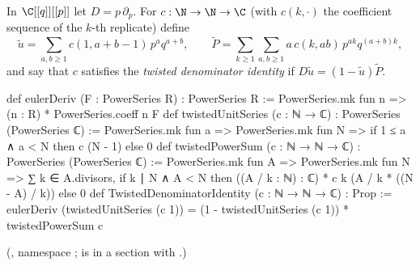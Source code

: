 \begin{definition}\label{ch19:def:twistedTD}
In $\C[[q]][[p]]$ let $D=p\,\partial_p$.  For $c:\N\to\N\to\C$ (with $c(k,\cdot)$ the coefficient sequence of the $k$-th
replicate) define
\begin{equation*}
  \tilde u=\sum_{a,b\ge1}c(1,a+b-1)\,p^aq^{a+b},\qquad
  \tilde P=\sum_{k\ge1}\sum_{a,b\ge1}a\,c(k,ab)\,p^{ak}q^{(a+b)k},
\end{equation*}
and say that $c$ satisfies the \emph{twisted denominator identity} if $D\tilde u=(1-\tilde u)\tilde P$.
\end{definition}
\begin{leancode}
def eulerDeriv (F : PowerSeries R) : PowerSeries R :=
  PowerSeries.mk fun n => (n : R) * PowerSeries.coeff n F
def twistedUnitSeries (c : ℕ → ℂ) : PowerSeries (PowerSeries ℂ) :=
  PowerSeries.mk fun a => PowerSeries.mk fun N => if 1 ≤ a ∧ a < N then c (N - 1) else 0
def twistedPowerSum (c : ℕ → ℕ → ℂ) : PowerSeries (PowerSeries ℂ) :=
  PowerSeries.mk fun A => PowerSeries.mk fun N =>
    ∑ k ∈ A.divisors,
      if k ∣ N ∧ A < N then ((A / k : ℕ) : ℂ) * c k (A / k * ((N - A) / k)) else 0
def TwistedDenominatorIdentity (c : ℕ → ℕ → ℂ) : Prop :=
  eulerDeriv (twistedUnitSeries (c 1)) = (1 - twistedUnitSeries (c 1)) * twistedPowerSum c
\end{leancode}
(, namespace ; 
is in a section with .)
